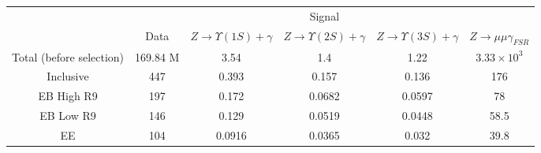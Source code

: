

\begin{tabular}{c|c|c|c|c|c}
\hline
\hline

&  &  \multicolumn{3}{c|}{Signal} &    \\
\cline{3-5}
& Data & $Z \rightarrow \Upsilon(1S)+\gamma$ & $Z \rightarrow \Upsilon(2S)+\gamma$ & $Z \rightarrow \Upsilon(3S)+\gamma$ &  $Z \rightarrow \mu\mu\gamma_{FSR}$  \\
\hline
Total (before selection) & 169.84 M &  3.54 & 1.4 & 1.22 & $3.33 \times 10^{3}$  \\
\hline\hline
Inclusive & 447  &  0.393 &  0.157 &  0.136 &  176  \\
EB High R9 & 197  &  0.172 &  0.0682 &  0.0597 &  78  \\
EB Low R9 & 146  &  0.129 &  0.0519 &  0.0448 &  58.5  \\
EE & 104  &  0.0916 &  0.0365 &  0.032 &  39.8 \\

\end{tabular}

